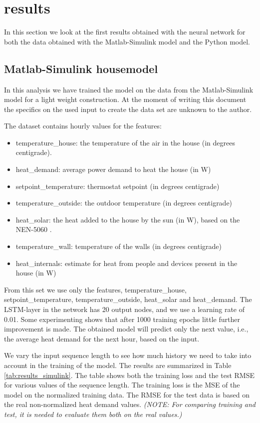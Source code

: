 \section{results}
In this section we look at the first results obtained with the neural network for both the data obtained with the Matlab-Simulink model and the Python model. 



\subsection{Matlab-Simulink housemodel}
In this analysis we have trained the model on the data from the Matlab-Simulink model for a light weight construction.  
At the moment of writing this document the specifics on the used input to create the data set are unknown to the author. 

The dataset contains hourly values for the features:
\begin{itemize}
\item temperature\_house: the temperature of the air in the house (in degrees centigrade). 
\item heat\_demand: average power demand to heat the house (in W)
\item setpoint\_temperature: thermostat setpoint (in degrees centigrade)
\item temperature\_outside: the outdoor temperature (in degrees centigrade)
\item heat\_solar: the heat added to the house by the sun (in W), based on the NEN-5060 \cite{NEN5060}. 
\item temperature\_wall: temperature of the walls (in degrees centigrade)
\item heat\_internals: estimate for heat from people and devices present in the house (in W) 
\end{itemize}

From this set we use only the features, temperature\_house, setpoint\_temperature, temperature\_outside, heat\_solar and heat\_demand. 
The LSTM-layer in the network has 20 output nodes, and we use a learning rate of 0.01. Some experimenting shows that after 1000 training epochs little further improvement is made. The obtained model will predict only the next value, i.e., the average heat demand for the next hour, based on the input. 

We vary the input sequence length to see how much history we need to take into account in the training of the model. The results are summarized in Table \ref{tab:results_simulink}. The table shows both the training loss and the test RMSE for various values of the sequence length. The training loss is the MSE of the model on the normalized training data. The RMSE for the test data is based on the real non-normalized heat demand values. \textit{(NOTE: For comparing training and test, it is needed to evaluate them both on the real values.)}

